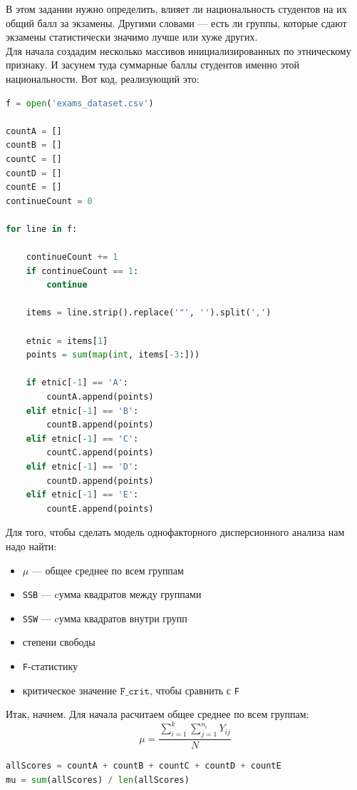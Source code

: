 \documentclass[14pt]{extreport}
\begin{document}
	В этом задании нужно определить, влияет ли национальность студентов на их общий балл за экзамены. Другими словами — есть ли группы, которые сдают экзамены статистически значимо лучше или хуже других. \\
	
	
	Для начала создадим несколько массивов инициализированных по этническому признаку. И засунем туда суммарные баллы студентов именно этой национальности. Вот код, реализующий это:
	
	\begin{lstlisting}[language=python, caption={Инициализация массивов с баллами}]
f = open('exams_dataset.csv')

countA = []
countB = []
countC = []
countD = []
countE = [] 
continueCount = 0

for line in f:

	continueCount += 1
	if continueCount == 1:
		continue
	
	items = line.strip().replace('"', '').split(',')
	
	etnic = items[1]
	points = sum(map(int, items[-3:])) 
	
	if etnic[-1] == 'A':
		countA.append(points)
	elif etnic[-1] == 'B':
		countB.append(points)
	elif etnic[-1] == 'C':
		countC.append(points)
	elif etnic[-1] == 'D':
		countD.append(points)
	elif etnic[-1] == 'E':
		countE.append(points)
\end{lstlisting}
	
	
	Для того, чтобы сделать модель однофакторного дисперсионного анализа нам надо найти:
	
	\begin{itemize}
		\item $\mu$ --- общее среднее по всем группам
		\item \texttt{SSB} --- cумма квадратов между группами
		\item \texttt{SSW} --- cумма квадратов внутри групп
		\item степени свободы
		\item \texttt{F}-статистику
		\item критическое значение $\mathtt{F\_crit}$, чтобы сравнить с \texttt{F}
	\end{itemize}
	
	Итак, начнем. Для начала расчитаем общее среднее по всем группам:
	\[
	\mu = \frac{\sum_{i=1}^{k} \sum_{j=1}^{n_i} Y_{ij}}{N}
	\]
	
	\begin{lstlisting}[language=python, caption=mean по всем группам]
allScores = countA + countB + countC + countD + countE
mu = sum(allScores) / len(allScores)
\end{lstlisting}
	
\end{document}
